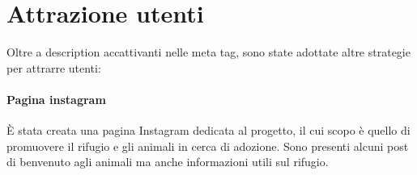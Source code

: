 \section{Attrazione utenti}
\label{sec:attrazione_utenti}
Oltre a description accattivanti nelle meta tag, sono state adottate altre strategie per attrarre utenti:
\paragraph{Pagina instagram}
È stata creata una pagina Instagram dedicata al progetto, il cui scopo è quello di promuovere il rifugio e gli animali in cerca di adozione. Sono presenti alcuni post di benvenuto agli animali ma anche informazioni utili sul rifugio.
